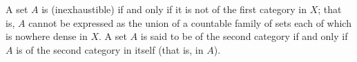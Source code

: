 A set $A$ is  (inexhaustible) if and only if it is not of the first category in $X$; that is, $A$ cannot be expressed as the union of a countable family of sets each of which is nowhere dense in $X$.
A set $A$ is said to be of the second category if and only if $A$ is of the second category in itself (that is, in $A$).